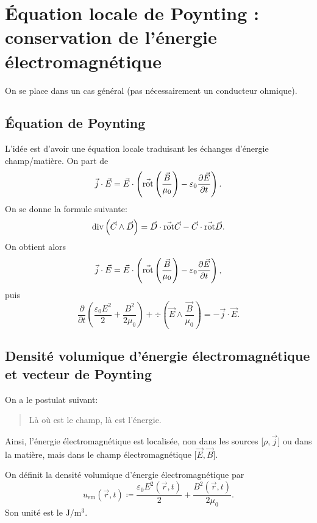 \section[Équation locale de Poynting]{Équation locale de Poynting : conservation de l'énergie électromagnétique}

On se place dans un cas général (pas nécessairement un conducteur ohmique).

\subsection{Équation de Poynting}

L'idée est d'avoir une équation locale traduisant les échanges d'énergie champ/matière.
On part de
\begin{equation}
    \vec{j}\cdot\vec{E}=\vec{E}\cdot\left(
        \vec{\mathrm{rot}}\left(\frac{\vec{B}}{\mu_0}\right)-\varepsilon_0\frac{\partial\vec{E}}{\partial t}
    \right).
\end{equation}
On se donne la formule suivante:
\begin{equation}
    \mathrm{div}\left(\vec{C}\wedge\vec{D}\right)=\vec{D}\cdot\vec{\mathrm{rot}}\vec{C}-\vec{C}\cdot\vec{\mathrm{rot}}\vec{D}.
\end{equation}
On obtient alors
\begin{equation}
    \vec{j}\cdot\vec{E}=\vec{E}\cdot\left(\vec{\mathrm{rot}}\left(\frac{\vec{B}}{\mu_0}\right)-\varepsilon_0\frac{\partial\vec{E}}{\partial t}\right),
\end{equation}
puis
\begin{equation}
    \boxed{
        \frac{\partial}{\partial t}\left(
            \frac{\varepsilon_0 E^{2}}{2}+\frac{B^{2}}{2\mu_0}
        \right)+\div\left(\vec{E}\wedge\frac{\vec{B}}{\mu_0}\right)=-\vec{j}\cdot\vec{E}.
    }
\end{equation}

\subsection{Densité volumique d'énergie électromagnétique et vecteur de Poynting}

On a le postulat suivant:
\begin{quote}
    Là où est le champ, là est l'énergie.
\end{quote}
Ainsi, l'énergie électromagnétique est localisée, non dans les sources [$\rho,\vec{j}$] ou dans la matière, mais dans le champ électromagnétique [$\vec{E},\vec{B}$].

On définit la densité volumique d'énergie électromagnétique par 
\begin{equation}
    \boxed{
        u_{\mathrm{em}}(\vec{r},t)\coloneqq\frac{\varepsilon_0 E^{2}(\vec{r},t)}{2}+\frac{B^{2}(\vec{r},t)}{2\mu_0}.
    }
\end{equation}
Son unité est le $\si{\joule\per\metre\cubed}$.

